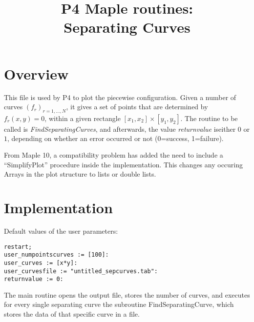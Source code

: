 \documentclass[a4paper,10pt]{article}
\title{P4 Maple routines:\\Separating Curves}
\author{}
\date{}
\begin{document}
\maketitle

\section{Overview}

This file is used by P4 to plot the piecewise configuration. Given a number of curves $(f_r)_{r=1,\dots,N}$, it gives a set of points that are determined by $f_r(x,y)=0$, within a given rectangle $[x_1,x_2]\times[y_1,y_2]$. The routine to be called is \emph{FindSeparatingCurves}, and afterwards, the value \emph{returnvalue} iseither $0$ or $1$, depending on whether an error occurred or not (0=success, 1=failure).

From Maple 10, a compatibility problem has added the need to include a ``SimplifyPlot'' procedure inside the implementation. This changes any occuring Arrays in the plot structure to lists or double lists.

\section{Implementation}

Default values of the user parameters:

\begin{lstlisting}[name=p4gcf]
restart;
user_numpointscurves := [100]:
user_curves := [x*y]:
user_curvesfile := "untitled_sepcurves.tab":
returnvalue := 0:
\end{lstlisting}

The main routine opens the output file, stores the number of curves,
and executes for every single separating curve the subroutine FindSeparatingCurve,
which stores the data of that specific curve in a file.
\end{document}
